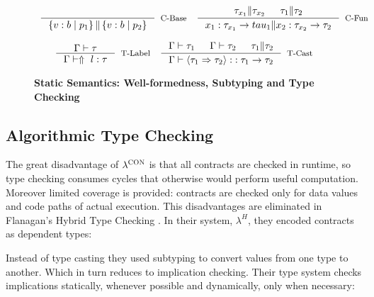 \begin{figure}[ht!]

\medskip {}
$$\begin{array}{cc}

\inference
  {}
  {\isCompatible{\tref{b}{p_1}}{\tref{b}{p_2}}}
  [\cbase]

&

\inference
  {\isCompatible{\tau_{x_1}}{\tau_{x_2}} &&
   \isCompatible{\tau_1}{\tau_2}}
  {\isCompatible{\tfun{x_1}{\tau_{x_1}}{tau_1}}{\tfun{x_2}{\tau_{x_2}}{\tau_2}}}
  [\cfunction]
\end{array}$$



\medskip {}
$$\begin{array}{cc}

\inference
  {\isWellFormed{\Gamma}{\tau}}
  {\hastype{\Gamma}{\elabel{l}}{\tau}}
  [\tlabel]

&

\inference
  {\isWellFormed{\Gamma}{\tau_1} &&
   \isWellFormed{\Gamma}{\tau_2} && 
   \isCompatible{\tau_1}{\tau_2}}
  {\hastype{\Gamma}{\ecast{\tau_1}{\tau_2}}{\tfun{}{\tau_1}{\tau_2}}}
  [\tcast]
\end{array}$$


\caption{\textbf{Static Semantics: Well-formedness, Subtyping and Type Checking}}
\label{fig:rules}
\end{figure}




\subsection{Algorithmic Type Checking}

The great disadvantage of $\lambda^{\textsc{CON}}$ is that all contracts are checked in runtime, 
so type checking consumes cycles that otherwise would perform useful computation.
Moreover limited coverage is provided: contracts are checked only for data values and
code paths of actual execution.
This disadvantages are eliminated in Flanagan's Hybrid Type Checking \cite{Flanagan06}.
In their system, $\lambda^H$, they encoded contracts as dependent types:


Instead of type casting they used subtyping to convert values from one type to another.
Which in turn reduces to implication checking.
Their type system checks implications statically, whenever possible
and dynamically, only when necessary:



